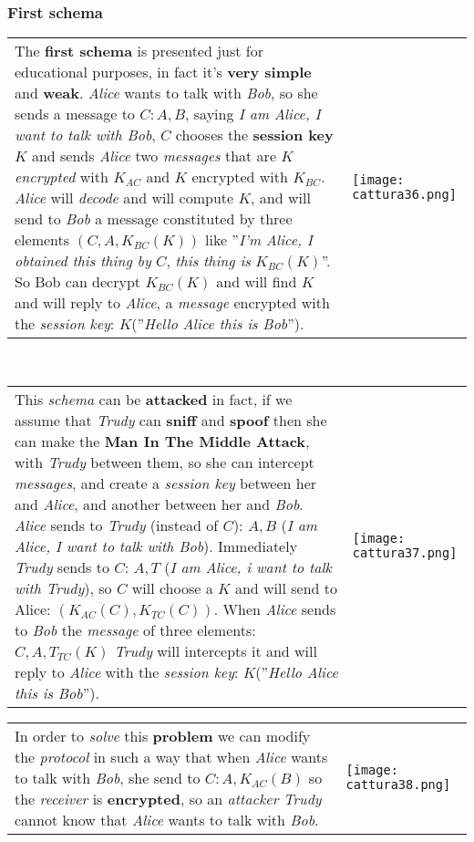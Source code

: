 \documentclass{article}
\begin{document}
\subsubsection{First schema}
\begin{tabular}{C{11cm}  L{10.5cm}}
The \textbf{first schema} is presented just for educational purposes, in fact it's \textbf{very simple} and \textbf{weak}. \emph{Alice} wants to talk with \emph{Bob}, so she sends a message to $C: A,B$, saying \emph{I am Alice, I want to talk with Bob}, $C$ chooses the \textbf{session key $K$ }and sends \emph{Alice} two \emph{messages} that are $K$ \emph{encrypted} with $K_{AC}$ and $K$ encrypted with $K_{BC}$. \emph{Alice} will \emph{decode} and will compute $K$, and will send to \emph{Bob} a message constituted by three elements $(C,A,K_{BC}(K))$ like ''\emph{I’m Alice, I obtained this thing by }$C$, \emph{this thing is }$K_{BC}(K)$”. So Bob can decrypt $K_{BC}(K)$ and will find $K$ and will reply to \emph{Alice}, a \emph{message} encrypted with the \emph{session key}: $K$(''\emph{Hello Alice this is Bob}'').
& \texttt{[image: cattura36.png]}
\end{tabular}
\hfill \break \\
\begin{tabular}{C{11cm}  L{10.5cm}}
This \emph{schema} can be \textbf{attacked} in fact, if we assume that \emph{Trudy} can \textbf{sniff} and \textbf{spoof} then she can make the \textbf{Man In The Middle Attack}, with \emph{Trudy} between them, so she can intercept \emph{messages}, and create a \emph{session key} between her and \emph{Alice}, and another between her and \emph{Bob}. \emph{Alice} sends to \emph{Trudy} (instead of $C$): $A, B$ (\emph{I am Alice, I want to talk with Bob}). Immediately \emph{Trudy} sends to $C$: $A,T$ (\emph{I am Alice, i want to talk with Trudy}), so $C$ will choose a $K$ and will send to Alice: $(K_{AC}(C),K_{TC}(C))$. When \emph{Alice} sends to \emph{Bob} the \emph{message} of three elements: $C, A, T_{TC}(K)$ \emph{Trudy} will intercepts it and will reply to \emph{Alice} with the \emph{session key}: $K$(''\emph{Hello Alice this is Bob}''). & \texttt{[image: cattura37.png]}
\end{tabular}
\begin{tabular}{C{11cm}  L{10.5cm}}
In order to \emph{solve} this \textbf{problem} we can modify the \emph{protocol} in such a way that when \emph{Alice} wants to talk with \emph{Bob}, she send to $C: A, K_{AC}(B)$ so the \emph{receiver} is \textbf{encrypted}, so an \emph{attacker Trudy} cannot know that \emph{Alice} wants to talk with \emph{Bob}.  
& \texttt{[image: cattura38.png]}
\end{tabular}
\end{document}
